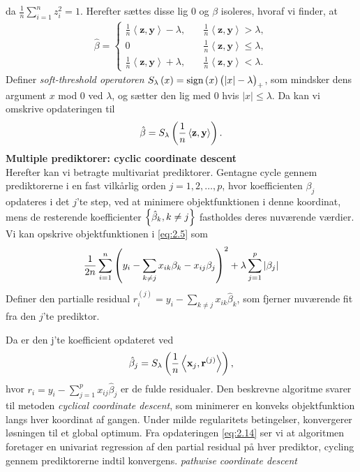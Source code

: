 da $\frac{1}{n} \sum_{i=1}^n z_i^2=1$. Herefter sættes disse lig 0 og $\beta$ isoleres, hvoraf vi finder, at
\begin{align*}
\hat{\beta} = \begin{cases}
\frac{1}{n} \left\langle \mathbf{z}, \mathbf{y} \right\rangle - \lambda, \quad &\frac{1}{n} \left\langle \mathbf{z}, \mathbf{y} \right\rangle > \lambda, \\
0 &\frac{1}{n} \left\langle \mathbf{z}, \mathbf{y} \right\rangle \leq \lambda, \\
\frac{1}{n} \left\langle \mathbf{z}, \mathbf{y} \right\rangle + \lambda, &\frac{1}{n} \left\langle \mathbf{z}, \mathbf{y} \right\rangle < \lambda.
\end{cases}
\end{align*}
Definer \textit{soft-threshold operatoren} $S_\lambda\del{x}=\text{sign}\del{x} \del{\vert x \vert - \lambda}_+$, som mindsker dens argument $x$ mod 0 ved $\lambda$, og sætter den lig med 0 hvis $\vert x \vert \leq \lambda$. Da kan vi omskrive opdateringen til
\begin{align*}
\hat{\beta} = S_\lambda \del{\frac{1}{n} \left\langle \mathbf{z}, \mathbf{y} \right\rangle}.
\end{align*}
%
\textbf{Multiple prediktorer: cyclic coordinate descent} \\
Herefter kan vi betragte multivariat prediktorer. 
Gentagne cycle gennem prediktorerne i en fast vilkårlig orden $j=1, 2, \ldots, p$, hvor koefficienten $\beta_j$ opdateres i det $j$'te step, ved at minimere objektfunktionen i denne koordinat, mens de resterende koefficienter $\cbr{\hat{\beta}_k, k \neq j}$ fastholdes deres nuværende værdier. 
Vi kan opskrive objektfunktionen i \eqref{eq:2.5} som
\begin{align*}
\frac{1}{2n} \sum_{i=1}^n \del{y_i - \sum_{k \neq j} x_{ik} \beta_k - x_{ij} \beta_j}^2 + \lambda \sum_{j = 1}^p \vert \beta_j \vert
\end{align*}
Definer den partialle residual $r_i^{(j)}=y_i - \sum_{k \neq j} x_{ik} \hat{\beta}_k$, som fjerner nuværende fit fra den $j$'te prediktor.


Da er den j'te koefficient opdateret ved
\begin{align}
\hat{\beta}_j = S_\lambda \del{\frac{1}{n} \left\langle \mathbf{x}_j, \mathbf{r}^{(j)} \right\rangle}, \label{eq:2.14}
\end{align}
hvor \(r_i = y_i - \sum_{j = 1}^p x_{ij} \hat{\beta}_j \) er de fulde residualer.
Den beskrevne algoritme svarer til metoden \textit{cyclical coordinate descent}, som minimerer en konveks objektfunktion langs hver koordinat af gangen.
Under milde regularitets betingelser, konvergerer løsningen til et global optimum.
Fra opdateringen \eqref{eq:2.14} ser vi at algoritmen foretager en univariat regression af den partial residual på hver prediktor, cycling gennem prediktorerne indtil konvergens.
\textit{pathwise coordinate descent}

